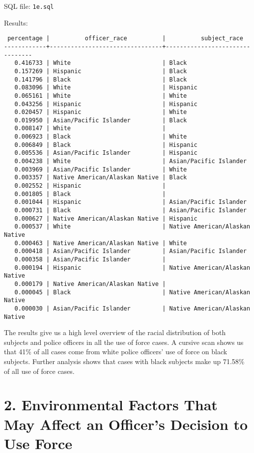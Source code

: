 \documentclass[10pt]{article}
\begin{document}
SQL file: \texttt{1e.sql}

Results:

\begin{verbatim}
 percentage |          officer_race          |          subject_race
------------+--------------------------------+--------------------------------
   0.416733 | White                          | Black
   0.157269 | Hispanic                       | Black
   0.141796 | Black                          | Black
   0.083096 | White                          | Hispanic
   0.065161 | White                          | White
   0.043256 | Hispanic                       | Hispanic
   0.020457 | Hispanic                       | White
   0.019950 | Asian/Pacific Islander         | Black
   0.008147 | White                          |
   0.006923 | Black                          | White
   0.006849 | Black                          | Hispanic
   0.005536 | Asian/Pacific Islander         | Hispanic
   0.004238 | White                          | Asian/Pacific Islander
   0.003969 | Asian/Pacific Islander         | White
   0.003357 | Native American/Alaskan Native | Black
   0.002552 | Hispanic                       |
   0.001805 | Black                          |
   0.001044 | Hispanic                       | Asian/Pacific Islander
   0.000731 | Black                          | Asian/Pacific Islander
   0.000627 | Native American/Alaskan Native | Hispanic
   0.000537 | White                          | Native American/Alaskan Native
   0.000463 | Native American/Alaskan Native | White
   0.000418 | Asian/Pacific Islander         | Asian/Pacific Islander
   0.000358 | Asian/Pacific Islander         |
   0.000194 | Hispanic                       | Native American/Alaskan Native
   0.000179 | Native American/Alaskan Native |
   0.000045 | Black                          | Native American/Alaskan Native
   0.000030 | Asian/Pacific Islander         | Native American/Alaskan Native
\end{verbatim}

The results give us a high level overview of the racial distribution of both subjects and police officers in all the use of force cases. A cursive scan shows us that 41\% of all cases come from white police officers' use of force on black subjects. Further analysis shows that cases with black subjects make up 71.58\% of all use of force cases.


\section*{2. Environmental Factors That May Affect an Officer’s Decision to Use Force}
\end{document}
